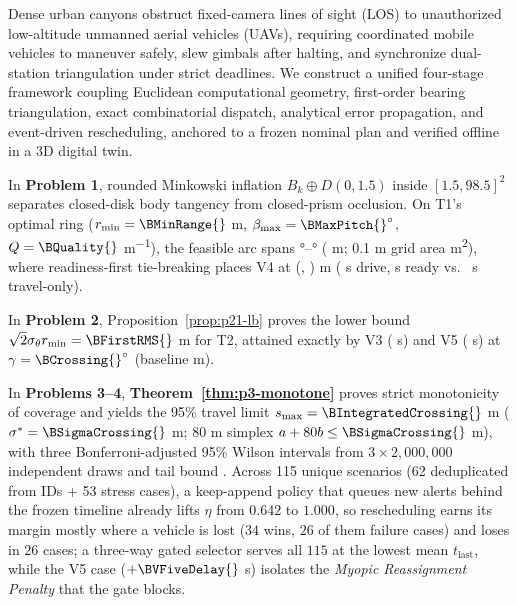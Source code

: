 Dense urban canyons obstruct fixed-camera lines of sight (LOS) to unauthorized low-altitude unmanned aerial vehicles (UAVs), requiring coordinated mobile vehicles to maneuver safely, slew gimbals after halting, and synchronize dual-station triangulation under strict deadlines. We construct a unified four-stage framework coupling Euclidean computational geometry, first-order bearing triangulation, exact combinatorial dispatch, analytical error propagation, and event-driven rescheduling, anchored to a frozen nominal plan and verified offline in a 3D digital twin.

In \textbf{Problem 1}, rounded Minkowski inflation $B_k\oplus D(0,1.5)$ inside $[1.5,98.5]^2$ separates closed-disk body tangency from closed-prism occlusion. On T1's optimal ring ($r_{\min}=\BMinRange{}$ m, $\beta_{\max}=\BMaxPitch{}^\circ$, $Q=\BQuality{}$ m\textsuperscript{$-1$}), the feasible arc spans \BArcStart{}°--\BArcEnd{}° (\BArcLength{} m; 0.1 m grid area \BGridArea{} m\textsuperscript{2}), where readiness-first tie-breaking places V4 at (\BStationX{}, \BStationY{}) m (\BArrivalTime{} s drive, \BReadyTime{} s ready vs.\ \BAltArrival{} s travel-only).

In \textbf{Problem 2}, Proposition~\ref{prop:p21-lb} proves the lower bound $\sqrt{2}\sigma_\theta r_{\min}=\BFirstRMS{}$ m for T2, attained exactly by V3 (\BTravelFirst{} s) and V5 (\BTravelSecond{} s) at $\gamma=\BCrossing{}^\circ$ (baseline \BBaseLength{} m).

In \textbf{Problems 3--4}, \textbf{Theorem~\ref{thm:p3-monotone}} proves strict monotonicity of coverage and yields the 95\% travel limit $s_{\max}=\BIntegratedCrossing{}$ m ($\sigma^*=\BSigmaCrossing{}$ m; 80 m simplex $a+80b\le\BSigmaCrossing{}$ m), with three Bonferroni-adjusted 95\% Wilson intervals from $3\times 2{,}000{,}000$ independent draws and tail bound \BFarBound{}. Across 115 unique scenarios (62 deduplicated from \BCaseCount{} IDs + 53 stress cases), a keep-append policy that queues new alerts behind the frozen timeline already lifts $\eta$ from $0.642$ to $1.000$, so rescheduling earns its margin mostly where a vehicle is lost ($34$ wins, $26$ of them failure cases) and loses in $26$ cases; a three-way gated selector serves all $115$ at the lowest mean $t_{\mathrm{last}}$, while the V5 case ($+\BVFiveDelay{}$ s) isolates the \emph{Myopic Reassignment Penalty} that the gate blocks.
